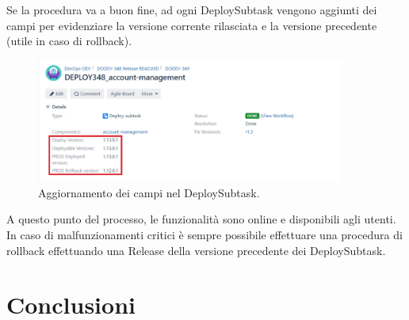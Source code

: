 \documentclass[a4paper, 12pt]{report}
\numberwithin{equation}{section}
\begin{document}
Se la procedura va a buon fine, ad ogni DeploySubtask vengono aggiunti dei campi per evidenziare la versione corrente rilasciata e la versione precedente (utile in caso di rollback).
\begin{figure}
    \centering
    \includegraphics[width=0.9\textwidth]{imgs/deploy-subtask.png}
    \caption{Aggiornamento dei campi nel DeploySubtask.}
    \label{fig:deploy-subtask}
\end{figure}
A questo punto del processo, le funzionalità sono online e disponibili agli utenti. In caso di malfunzionamenti critici è sempre possibile effettuare una procedura di rollback effettuando una Release della versione precedente dei DeploySubtask.



\chapter*{Conclusioni}\label{conclusioni}


\listoffigures
\end{document}

